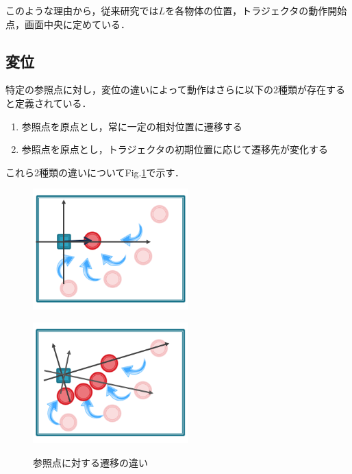 このような理由から，従来研究では$L$を各物体の位置，トラジェクタの動作開始点，画面中央に定めている．

\subsection{変位}

特定の参照点に対し，変位の違いによって動作はさらに以下の2種類が存在すると定義されている．

	\begin{enumerate}
		\item 参照点を原点とし，常に一定の相対位置に遷移する
		\item 参照点を原点とし，トラジェクタの初期位置に応じて遷移先が変化する
	\end{enumerate}
これら2種類の違いについてFig.\ref{figure:2_difference_displacement}で示す．
\begin{figure}[h]
	\centering
	\begin{minipage}[t]{.4\textwidth}
		\centering
		\includegraphics[width=6cm]{figure2_2_sub_a.png} \\ %
		\label{subfigure:2_difference_displacement1}    
	\end{minipage}
	\begin{minipage}[t]{.4\textwidth}
		\centering
		\includegraphics[width=6cm]{figure2_2_sub_b.png} \\ %
		\label{subfigure:2_difference_displacement2}
	\end{minipage}
	\caption{参照点に対する遷移の違い}
	\label{figure:2_difference_displacement}
\end{figure}

